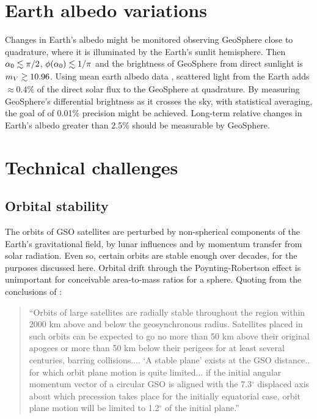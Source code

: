 \documentclass[useAMS,usenatbib]{mn2e}
\newcommand\lta { \mathrel {\hbox to 0pt {\lower 3.7pt \hbox{$\sim$}
      \hss} \raise 1.7pt \hbox{$<$}}}
\newcommand\gta { \mathrel {\hbox to 0pt {\lower 3.7pt \hbox{$\sim$}
      \hss} \raise 1.7pt \hbox{$>$}}}
\newcommand\name{LAMBERT}
\renewcommand\name{GeoSphere}
\begin{document}
\section{Earth albedo variations }

Changes in Earth's albedo might be monitored observing  \name{} 
close to quadrature, where it is illuminated by the Earth's 
sunlit hemisphere. Then $\alpha_0 \lta \pi/2$,
$\phi(\alpha_0) \lta 1/\pi$ and the brightness of \name{} from direct
sunlight is $m_V\gta 10.96$.  Using mean earth albedo data 
\citep{Allen1973}, scattered light from the Earth adds
$\approx 0.4\%$ of the direct solar
flux to the \name{} at quadrature.    By measuring \name{}'s differential 
brightness as it crosses the sky, with statistical averaging, 
the goal of 
of 0.01\% precision might be achieved. Long-term relative changes in
Earth's albedo greater than  2.5\% should be measurable by \name.  

\section{Technical challenges}

\subsection{Orbital stability}

The orbits of GSO satellites are perturbed by 
non-spherical components of the Earth's gravitational field, by lunar
influences and by momentum transfer from solar radiation.  Even so, 
certain orbits are stable enough over decades, for
the purposes discussed here.  Orbital drift through the
Poynting-Robertson effect is unimportant for conceivable area-to-mass
ratios for a sphere.  Quoting from the conclusions of
\cite{Friesen+others1992}:

\begin{quote}
``Orbits of large satellites are radially stable throughout the region
within 2000 km above and below the geosynchronous radius.  Satellites
placed in such orbits can be expected to go no more than 50 km above
their original apogees or more than 50 km below their perigees for at
least several centuries, barring collisions.... `A stable plane'
exists at the GSO distance.. for which orbit plane motion is quite
limited... if the initial angular momentum vector of a circular GSO
is aligned with the 7.3$^\circ$ displaced axis about which
precession takes place for the initially equatorial case, orbit plane
motion will be limited to 1.2$^\circ$ of the initial plane.''
\end{quote}
\end{document}
